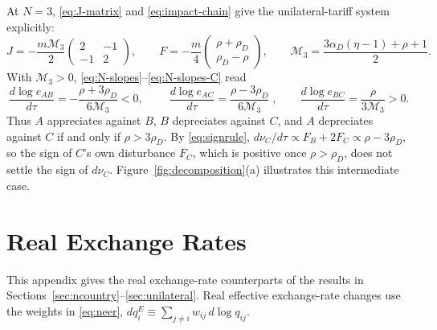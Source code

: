 \documentclass[11pt]{article}
\begin{document}
At $N=3$, \eqref{eq:J-matrix} and \eqref{eq:impact-chain} give the unilateral-tariff system explicitly:
\begin{equation}
J=-\frac{m\mathcal M_3}{2}
\begin{pmatrix}
2 & -1\\
-1 & 2
\end{pmatrix},
\qquad
F=-\frac{m}{4}
\begin{pmatrix}
\rho+\rho_D\\
\rho_D-\rho
\end{pmatrix},
\qquad
\mathcal M_3=\frac{3\alpha_D(\eta-1)+\rho+1}{2}.
\label{eq:3c-JF}
\end{equation}
With $\mathcal M_3>0$, \eqref{eq:N-slopes}--\eqref{eq:N-slopes-C} read
\begin{equation}
\frac{d\log e_{AB}}{d\tau}
=-\frac{\rho+3\rho_D}{6\mathcal M_3}<0, \qquad
\boxed{\;\frac{d\log e_{AC}}{d\tau}
=\frac{\rho-3\rho_D}{6\mathcal M_3}\;}, \qquad
\frac{d\log e_{BC}}{d\tau}
=\frac{\rho}{3\mathcal M_3}>0.
\label{eq:3c-slopes}
\end{equation}
Thus $A$ appreciates against $B$, $B$ depreciates against $C$, and $A$ depreciates against $C$ if and only if $\rho>3\rho_D$. By \eqref{eq:signrule}, $d\nu_C/d\tau\propto F_B+2F_C\propto\rho-3\rho_D$, so the sign of $C$'s own disturbance $F_C$, which is positive once $\rho>\rho_D$, does not settle the sign of $d\nu_C$. Figure~\ref{fig:decomposition}(a) illustrates this intermediate case.

\FloatBarrier

\section{Real Exchange Rates}

\label{app:real}

This appendix gives the real exchange-rate counterparts of the results in Sections~\ref{sec:ncountry}--\ref{sec:unilateral}. Real effective exchange-rate changes use the weights in \eqref{eq:neer}, $dq_i^E\equiv\sum_{j\neq i}w_{ij}\,d\log q_{ij}$.
\end{document}
